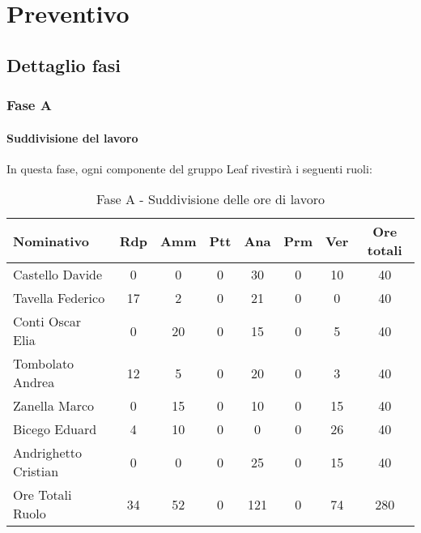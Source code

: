 \documentclass[../PianoProgetto.tex]{subfiles}
\begin{document}
	\section{Preventivo}
		\subsection{Dettaglio fasi}
			\subsubsection{Fase A}
				\paragraph{Suddivisione del lavoro}
					In questa fase, ogni componente del gruppo Leaf rivestirà i seguenti ruoli:
	
					\begin{table}[h]
		\centering
	
		\begin{tabular}{l * {7}{c}}
			\toprule
			Nominativo & Rdp & Amm & Ptt & Ana & Prm & Ver & Ore totali \\
			\midrule
			Castello Davide &	0 &	0 &	0 &	30 & 0 &	10 & 40 \\
			\midrule
			Tavella Federico &	17 & 2 & 0 & 21 & 0 & 0 & 40 \\
			\midrule
			Conti Oscar Elia & 0 & 20 &	0 &	15 & 0 & 5 & 40 \\
			\midrule
			Tombolato Andrea & 12 & 5 &	0 &	20 & 0 & 3 & 40 \\
			\midrule
			Zanella Marco & 0 & 15 & 0 & 10 & 0 & 15 & 40 \\
			\midrule
			Bicego Eduard & 4 & 10 & 0 & 0 & 0 & 26 & 40 \\
			\midrule
			Andrighetto Cristian & 0 & 0 &	0 &	25 & 0 & 15 & 40 \\
			\midrule			
			Ore Totali Ruolo & 34 & 52 & 0 & 121 &	0 &	74 & 280 \\
			\bottomrule
			
		\end{tabular}
		
		\caption{Fase A - Suddivisione delle ore di lavoro}
		\label{tab:faseA_ore}
		
	\end{table}
	
\end{document}
